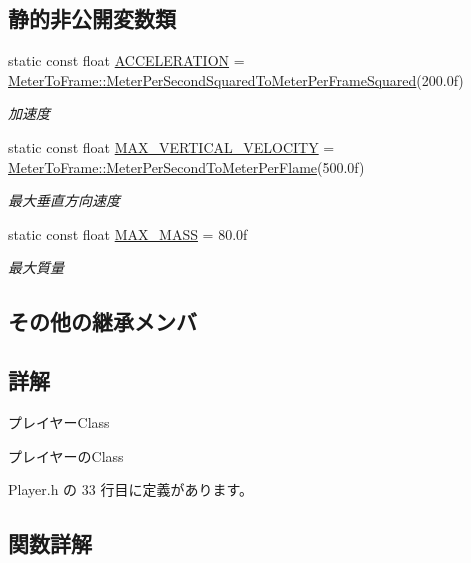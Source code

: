 \subsection*{静的非公開変数類}
\begin{DoxyCompactItemize}
\item 
static const float \mbox{\hyperlink{class_player_a93f160503f5e15ca8d9675b5d3d14706}{A\+C\+C\+E\+L\+E\+R\+A\+T\+I\+ON}} = \mbox{\hyperlink{class_meter_to_frame_ac3292be31b35e97027a65b4c74763ebe}{Meter\+To\+Frame\+::\+Meter\+Per\+Second\+Squared\+To\+Meter\+Per\+Frame\+Squared}}(200.\+0f)
\begin{DoxyCompactList}\small\item\em 加速度 \end{DoxyCompactList}\item 
static const float \mbox{\hyperlink{class_player_ac436f0b176fe8d747919df13ebacb428}{M\+A\+X\+\_\+\+V\+E\+R\+T\+I\+C\+A\+L\+\_\+\+V\+E\+L\+O\+C\+I\+TY}} = \mbox{\hyperlink{class_meter_to_frame_aa5468938f59eb934bfc6a897a7513812}{Meter\+To\+Frame\+::\+Meter\+Per\+Second\+To\+Meter\+Per\+Flame}}(500.\+0f)
\begin{DoxyCompactList}\small\item\em 最大垂直方向速度 \end{DoxyCompactList}\item 
static const float \mbox{\hyperlink{class_player_a1d3ffee6a3d31efa3a7b18ab639ced96}{M\+A\+X\+\_\+\+M\+A\+SS}} = 80.\+0f
\begin{DoxyCompactList}\small\item\em 最大質量 \end{DoxyCompactList}\end{DoxyCompactItemize}
\subsection*{その他の継承メンバ}


\subsection{詳解}
プレイヤー\+Class 

プレイヤーの\+Class 

 Player.\+h の 33 行目に定義があります。



\subsection{関数詳解}
\mbox{\label{class_player_aa3adab06a1122754f468413b5d3a165f}} 
